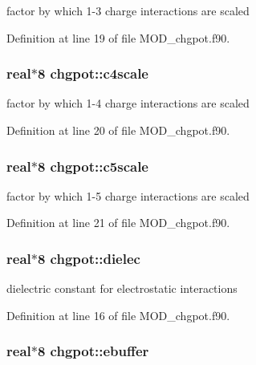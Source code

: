 factor by which 1-\/3 charge interactions are scaled 



Definition at line 19 of file M\-O\-D\-\_\-chgpot.\-f90.

\hypertarget{classchgpot_ae1c372d6354cffbc203abc5fe288e58e}{
\subsubsection[{c4scale}]{\setlength{\rightskip}{0pt plus 5cm}real$\ast$8 chgpot\-::c4scale}}\label{classchgpot_ae1c372d6354cffbc203abc5fe288e58e}


factor by which 1-\/4 charge interactions are scaled 



Definition at line 20 of file M\-O\-D\-\_\-chgpot.\-f90.

\hypertarget{classchgpot_a7555f2c48e0d6325ffbc427a49cf1676}{
\subsubsection[{c5scale}]{\setlength{\rightskip}{0pt plus 5cm}real$\ast$8 chgpot\-::c5scale}}\label{classchgpot_a7555f2c48e0d6325ffbc427a49cf1676}


factor by which 1-\/5 charge interactions are scaled 



Definition at line 21 of file M\-O\-D\-\_\-chgpot.\-f90.

\hypertarget{classchgpot_a4e604b81e5aace26f2ca72d9b8f87010}{
\subsubsection[{dielec}]{\setlength{\rightskip}{0pt plus 5cm}real$\ast$8 chgpot\-::dielec}}\label{classchgpot_a4e604b81e5aace26f2ca72d9b8f87010}


dielectric constant for electrostatic interactions 



Definition at line 16 of file M\-O\-D\-\_\-chgpot.\-f90.

\hypertarget{classchgpot_adc0e1ef630af9b001db33bd1e354bbfc}{
\subsubsection[{ebuffer}]{\setlength{\rightskip}{0pt plus 5cm}real$\ast$8 chgpot\-::ebuffer}}\label{classchgpot_adc0e1ef630af9b001db33bd1e354bbfc}



